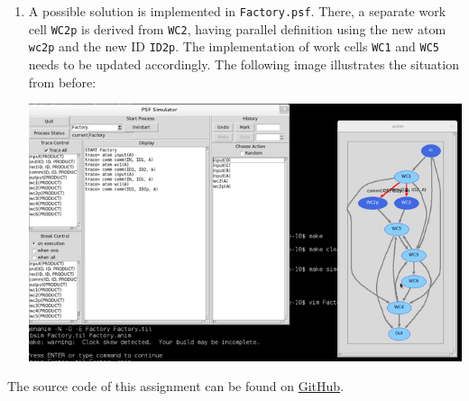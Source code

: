 \documentclass[a4paper]{article}
\newcommand{\prog}[1]{\texttt{#1}}
\begin{document}
\begin{enumerate}
    \item A possible solution is implemented in \texttt{Factory.psf}. There, a
        separate work cell \prog{WC2p} is derived from \prog{WC2}, having
        parallel definition using the new atom \prog{wc2p} and the new ID
        \prog{ID2p}. The implementation of work cells \prog{WC1} and \prog{WC5}
        needs to be updated accordingly. The following image illustrates the
        situation from before:

        \includegraphics[scale=0.5]{animation-splitted-1.png}
\end{enumerate}

The source code of this assignment can be found on
\href{https://github.com/comco/concurrency-theory-assignments/tree/master/assignment-lecture-10}{GitHub}.
\end{document}
